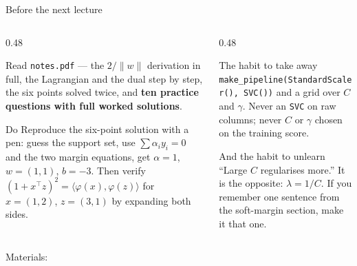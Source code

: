 \documentclass[aspectratio=169]{beamer}
\begin{document}
\begin{frame}[shrink=4]{Before the next lecture}
  \begin{columns}[T]
    \begin{column}{0.48\textwidth}
      \begin{block}{Read}
        \texttt{notes.pdf} --- the $2/\|w\|$ derivation in full, the
        Lagrangian and the dual step by step, the six points solved twice,
        and \textbf{ten practice questions with full worked solutions}.
      \end{block}
      \begin{block}{Do}
        Reproduce the six-point solution with a pen: guess the support set,
        use $\sum\alpha_i y_i = 0$ and the two margin equations, get
        $\alpha = 1$, $w = (1,1)$, $b = -3$. Then verify
        $(1 + x^\top z)^2 = \langle\varphi(x),\varphi(z)\rangle$ for
        $x = (1,2)$, $z = (3,1)$ by expanding both sides.
      \end{block}
    \end{column}
    \begin{column}{0.48\textwidth}
      \begin{exampleblock}{The habit to take away}
        \texttt{make\_pipeline(StandardScaler(), SVC())} and a grid over
        $C$ and $\gamma$. Never an \texttt{SVC} on raw columns; never $C$ or
        $\gamma$ chosen on the training score.
      \end{exampleblock}
      \begin{alertblock}{And the habit to unlearn}
        ``Large $C$ regularises more.'' It is the opposite:
        $\lambda = 1/C$. If you remember one sentence from the soft-margin
        section, make it that one.
      \end{alertblock}
    \end{column}
  \end{columns}
  \begin{center}
    \small Materials: \texttt{\AMLRepoURL}
  \end{center}
  \slidesources{\AMLUnitVISources}
\end{frame}
\end{document}
